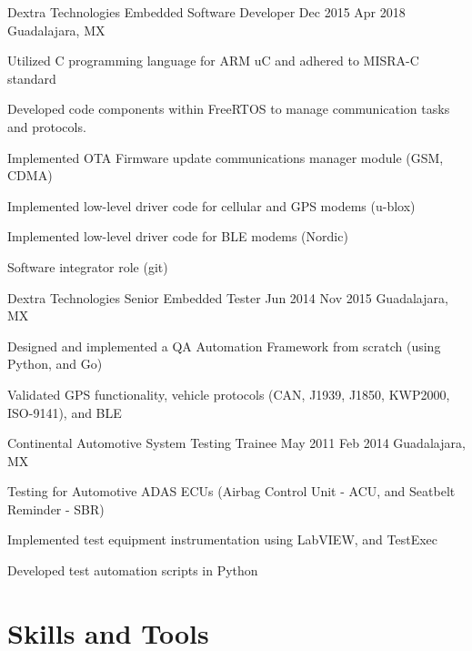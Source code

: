 \documentclass{resume} %
\begin{document}
\job
    {Dextra Technologies}
    {Embedded Software Developer}
    {Dec 2015}
    {Apr 2018}
    {Guadalajara, MX}
    {
    \begin{itemize-bullets}
    \item{Utilized C programming language for ARM uC and adhered to MISRA-C standard}
    \item{Developed code components within FreeRTOS to manage communication tasks and protocols.}
    \item{Implemented OTA Firmware update communications manager module (GSM, CDMA)}
    \item{Implemented low-level driver code for cellular and GPS modems (u-blox)}
    \item{Implemented low-level driver code for BLE modems (Nordic)}
    \item{Software integrator role (git)}
    \end{itemize-bullets}
    }


\job
    {Dextra Technologies}
    {Senior Embedded Tester}
    {Jun 2014}
    {Nov 2015}
    {Guadalajara, MX}
    {
    \begin{itemize-bullets}
    \item{Designed and implemented a QA Automation Framework from scratch (using Python, and Go)}
    \item{Validated GPS functionality, vehicle protocols (CAN, J1939, J1850, KWP2000, ISO-9141), and BLE}
    \end{itemize-bullets}
    }


\job
    {Continental Automotive}
    {System Testing Trainee}
    {May 2011}
    {Feb 2014}
    {Guadalajara, MX}
    {
    \begin{itemize-bullets}
    \item{Testing for Automotive ADAS ECUs (Airbag Control Unit - ACU, and Seatbelt Reminder - SBR)}
    \item{Implemented test equipment instrumentation using LabVIEW, and TestExec}
    \item{Developed test automation scripts in Python}
    \end{itemize-bullets}
    }



\section{Skills and Tools}
\end{document}

